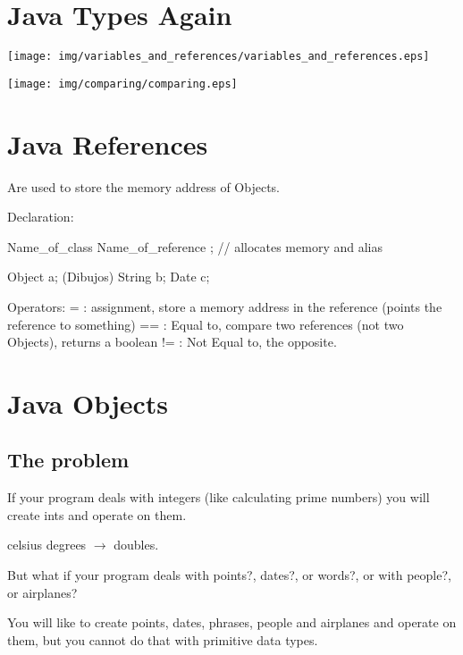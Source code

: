 \documentclass[a4paper, 9pt]{extarticle}
\begin{document}
\section{Java Types Again}

\begin{center}
\texttt{[image: img/variables\_and\_references/variables\_and\_references.eps]}
\end{center}

\begin{center}
\texttt{[image: img/comparing/comparing.eps]}
\end{center}









\section{Java References}

Are used to store the memory address of Objects.

\begin{blackboard}
Declaration:

  Name_of_class Name_of_reference ; // allocates memory and alias

  Object a;       (Dibujos)
  String b;
  Date   c;

Operators:
  = : assignment, store a memory address in the reference (points the reference
      to something)
  == : Equal to, compare two references (not two Objects), returns a boolean
  != : Not Equal to, the opposite.
\end{blackboard}

\section{Java Objects}

\subsection{The problem}

If your program deals with integers (like calculating prime numbers) you will
create ints and operate on them.

celsius degrees $\rightarrow$ doubles.

But what if your program deals with points?, dates?, or words?, or with
people?, or airplanes?

You will like to create points, dates, phrases, people and airplanes and
operate on them, but you cannot do that with primitive data types.
\end{document}
